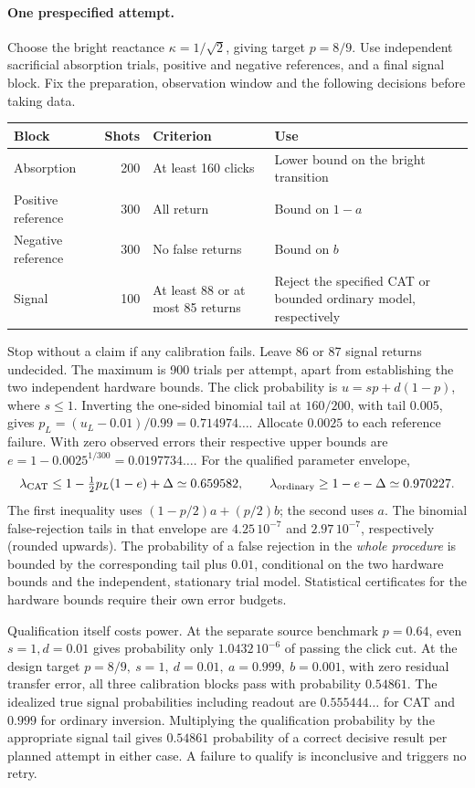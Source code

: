 \paragraph{One prespecified attempt.}
Choose the bright reactance \(\kappa=1/\sqrt2\), giving target \(p=8/9\). Use independent sacrificial absorption trials, positive and negative references, and a final signal block. Fix the preparation, observation window and the following decisions before taking data.
\begin{center}\small
\begin{tabularx}{\linewidth}{@{}lrlX@{}}\toprule
Block & Shots & Criterion & Use\\\midrule
Absorption & 200 & At least 160 clicks & Lower bound on the bright transition\\
Positive reference & 300 & All return & Bound on \(1-a\)\\
Negative reference & 300 & No false returns & Bound on \(b\)\\
Signal & 100 & At least 88 or at most 85 returns & Reject the specified CAT or bounded ordinary model, respectively\\
\bottomrule\end{tabularx}
\end{center}
Stop without a claim if any calibration fails. Leave 86 or 87 signal returns undecided. The maximum is 900 trials per attempt, apart from establishing the two independent hardware bounds. The click probability is \(u=sp+d(1-p)\), where \(s\le1\). Inverting the one-sided binomial tail at \(160/200\), with tail \(0.005\), gives \(p_L=(u_L-0.01)/0.99=0.714974\ldots\). Allocate \(0.0025\) to each reference failure. With zero observed errors their respective upper bounds are \(e=1-0.0025^{1/300}=0.0197734\ldots\). For the qualified parameter envelope,
\[
 \lambda_{\rm CAT}\le 1-\tfrac12 p_L(1-e)+\Delta\simeq0.659582,\qquad
 \lambda_{\rm ordinary}\ge 1-e-\Delta\simeq0.970227 .
\]
The first inequality uses \((1-p/2)a+(p/2)b\); the second uses \(a\). The binomial false-rejection tails in that envelope are \(4.25\,10^{-7}\) and \(2.97\,10^{-7}\), respectively (rounded upwards). The probability of a false rejection in the \emph{whole procedure} is bounded by the corresponding tail plus \(0.01\), conditional on the two hardware bounds and the independent, stationary trial model. Statistical certificates for the hardware bounds require their own error budgets.

Qualification itself costs power. At the separate source benchmark \(p=0.64\), even \(s=1,d=0.01\) gives probability only \(1.0432\,10^{-6}\) of passing the click cut. At the design target \(p=8/9,\ s=1,\ d=0.01,\ a=0.999,\ b=0.001\), with zero residual transfer error, all three calibration blocks pass with probability \(0.54861\). The idealized true signal probabilities including readout are \(0.555444\ldots\) for CAT and \(0.999\) for ordinary inversion. Multiplying the qualification probability by the appropriate signal tail gives \(0.54861\) probability of a correct decisive result per planned attempt in either case. A failure to qualify is inconclusive and triggers no retry.

